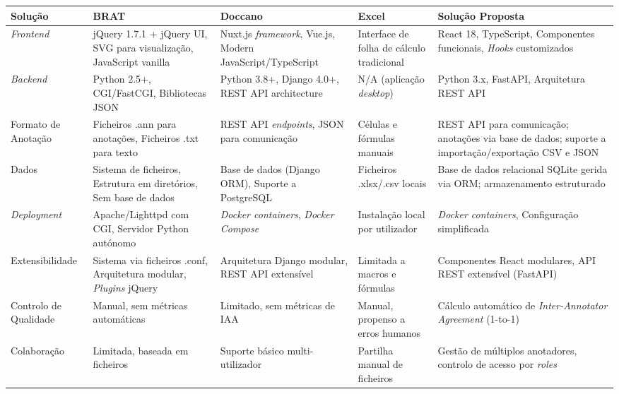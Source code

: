 \clearpage
\begin{table}[p]
\setlength{\footnotesep}{15pt}
\begin{minipage}{\textwidth}
\centering
\footnotesize
\begin{adjustbox}{width=\textwidth,center}
\begin{tabular}{|l|p{3.5cm}|p{3.5cm}|p{3.5cm}|p{3.5cm}|}
\hline
\textbf{Solução} & \textbf{BRAT\protect\footnotemark[1]} & \textbf{Doccano\protect\footnotemark[2]} & \textbf{Excel} & \textbf{Solução Proposta} \\
\hline
\textit{Frontend} & jQuery 1.7.1 + jQuery UI, SVG para visualização, JavaScript vanilla & Nuxt.js \textit{framework}, Vue.js, Modern JavaScript/TypeScript & Interface de folha de cálculo tradicional & React 18, TypeScript, Componentes funcionais, \textit{Hooks} customizados \\
\hline
\textit{Backend} & Python 2.5+, CGI/FastCGI, Bibliotecas JSON & Python 3.8+, Django 4.0+, REST API architecture & N/A (aplicação \textit{desktop}) & Python 3.x, FastAPI, Arquitetura REST API \\
\hline
Formato de Anotação & Ficheiros .ann para anotações, Ficheiros .txt para texto & REST API \textit{endpoints}, JSON para comunicação & Células e fórmulas manuais & REST API para comunicação; anotações via base de dados; suporte a importação/exportação CSV e JSON \\
\hline
Dados & Sistema de ficheiros, Estrutura em diretórios, Sem base de dados & Base de dados (Django ORM), Suporte a PostgreSQL & Ficheiros .xlsx/.csv locais & Base de dados relacional SQLite gerida via ORM; armazenamento estruturado \\
\hline
\textit{Deployment} & Apache/Lighttpd com CGI, Servidor Python autónomo & \textit{Docker containers}, \textit{Docker Compose} & Instalação local por utilizador & \textit{Docker containers}, Configuração simplificada \\
\hline
Extensibilidade & Sistema via ficheiros .conf, Arquitetura modular, \textit{Plugins} jQuery & Arquitetura Django modular, REST API extensível & Limitada a macros e fórmulas & Componentes React modulares, API REST extensível (FastAPI) \\
\hline
Controlo de Qualidade & Manual, sem métricas automáticas & Limitado, sem métricas de IAA & Manual, propenso a erros humanos & Cálculo automático de \textit{Inter-Annotator Agreement} (1-to-1) \\
\hline
Colaboração & Limitada, baseada em ficheiros & Suporte básico multi-utilizador & Partilha manual de ficheiros & Gestão de múltiplos anotadores, controlo de acesso por \textit{roles} \\

\end{tabular}
\end{adjustbox}
\end{minipage}
\end{table}
